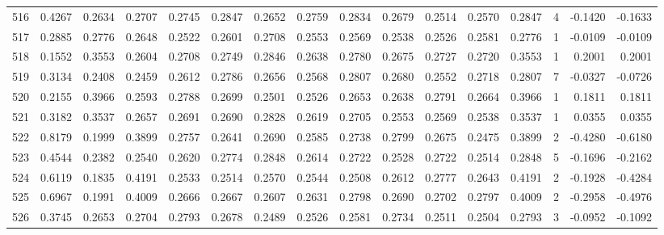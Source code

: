 \begin{tabular}{lrrrrrrrrrrrrrrr}
516 &      0.4267 &  0.2634 &  0.2707 &  0.2745 &  0.2847 &  0.2652 &  0.2759 &  0.2834 &  0.2679 &  0.2514 &   0.2570 &     0.2847 &      4 &                   -0.1420 &                    -0.1633 \\
517 &      0.2885 &  0.2776 &  0.2648 &  0.2522 &  0.2601 &  0.2708 &  0.2553 &  0.2569 &  0.2538 &  0.2526 &   0.2581 &     0.2776 &      1 &                   -0.0109 &                    -0.0109 \\
518 &      0.1552 &  0.3553 &  0.2604 &  0.2708 &  0.2749 &  0.2846 &  0.2638 &  0.2780 &  0.2675 &  0.2727 &   0.2720 &     0.3553 &      1 &                    0.2001 &                     0.2001 \\
519 &      0.3134 &  0.2408 &  0.2459 &  0.2612 &  0.2786 &  0.2656 &  0.2568 &  0.2807 &  0.2680 &  0.2552 &   0.2718 &     0.2807 &      7 &                   -0.0327 &                    -0.0726 \\
520 &      0.2155 &  0.3966 &  0.2593 &  0.2788 &  0.2699 &  0.2501 &  0.2526 &  0.2653 &  0.2638 &  0.2791 &   0.2664 &     0.3966 &      1 &                    0.1811 &                     0.1811 \\
521 &      0.3182 &  0.3537 &  0.2657 &  0.2691 &  0.2690 &  0.2828 &  0.2619 &  0.2705 &  0.2553 &  0.2569 &   0.2538 &     0.3537 &      1 &                    0.0355 &                     0.0355 \\
522 &      0.8179 &  0.1999 &  0.3899 &  0.2757 &  0.2641 &  0.2690 &  0.2585 &  0.2738 &  0.2799 &  0.2675 &   0.2475 &     0.3899 &      2 &                   -0.4280 &                    -0.6180 \\
523 &      0.4544 &  0.2382 &  0.2540 &  0.2620 &  0.2774 &  0.2848 &  0.2614 &  0.2722 &  0.2528 &  0.2722 &   0.2514 &     0.2848 &      5 &                   -0.1696 &                    -0.2162 \\
524 &      0.6119 &  0.1835 &  0.4191 &  0.2533 &  0.2514 &  0.2570 &  0.2544 &  0.2508 &  0.2612 &  0.2777 &   0.2643 &     0.4191 &      2 &                   -0.1928 &                    -0.4284 \\
525 &      0.6967 &  0.1991 &  0.4009 &  0.2666 &  0.2667 &  0.2607 &  0.2631 &  0.2798 &  0.2690 &  0.2702 &   0.2797 &     0.4009 &      2 &                   -0.2958 &                    -0.4976 \\
526 &      0.3745 &  0.2653 &  0.2704 &  0.2793 &  0.2678 &  0.2489 &  0.2526 &  0.2581 &  0.2734 &  0.2511 &   0.2504 &     0.2793 &      3 &                   -0.0952 &                    -0.1092 \\

\end{tabular}
